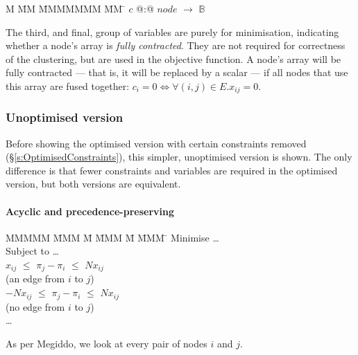 \begin{tabbing}
M   \= MM \= MMMMMMM \= MM \= \kill
$c$   \> @:@  \> $node$             \> $\to$ \> $\mathbb{B}$
\end{tabbing}
The third, and final, group of variables are purely for minimisation, indicating whether a node's array is \emph{fully contracted}.
They are not required for correctness of the clustering, but are used in the objective function.
A node's array will be fully contracted --- that is, it will be replaced by a scalar --- if all nodes that use this array are fused together: $c_i = 0 \iff \forall (i,j) \in E. x_{ij} = 0$. 


\subsubsection{Unoptimised version}
Before showing the optimised version with certain constraints removed (\S\ref{s:OptimisedConstraints}), this simpler, unoptimised version is shown. The only difference is that fewer constraints and variables are required in the optimised version, but both versions are equivalent.   


\paragraph{Acyclic and precedence-preserving}

\begin{tabbing}
MMMMM   \= MMM \= M \= MMM \= M \= MMM \= \kill
Minimise   \> \ldots \\
Subject to \> \ldots \\
           \>    $x_{ij}$ \> $\le$ \> $\pi_j - \pi_i$ \> $\le$ \> $N x_{ij}$ \\
           \>             (an edge from $i$ to $j$)            \\
           \> $-N x_{ij}$ \> $\le$ \> $\pi_j - \pi_i$ \> $\le$ \> $N x_{ij}$ \\
           \>             (no edge from $i$ to $j$)            \\
           \> \ldots
\end{tabbing}
As per Megiddo\cite{megiddo1998optimal}, we look at every pair of nodes $i$ and $j$.

